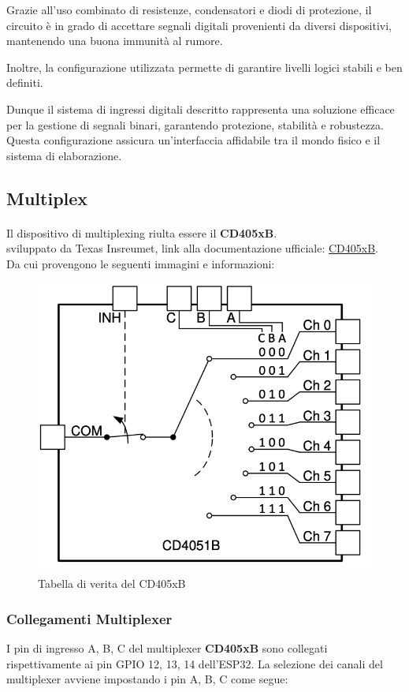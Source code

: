 \documentclass[12pt,a4paper]{report}
\begin{document}
Grazie all'uso combinato di resistenze, condensatori e diodi di protezione, il circuito è in grado di accettare segnali digitali provenienti da diversi dispositivi, mantenendo una buona immunità al rumore. 

Inoltre, la configurazione utilizzata permette di garantire livelli logici stabili e ben definiti.

Dunque il sistema di ingressi digitali descritto rappresenta una soluzione efficace per la gestione di segnali binari, garantendo protezione, stabilità e robustezza. Questa configurazione assicura un'interfaccia affidabile tra il mondo fisico e il sistema di elaborazione.

\newpage
\subsection{Multiplex}
\paragraph{ }
Il dispositivo di multiplexing riulta essere il \textbf{CD405xB}. \\
sviluppato da Texas Insreumet, link alla documentazione ufficiale: \href{https://www.ti.com/lit/ds/symlink/cd4051b.pdf}{CD405xB}. \\ 

Da cui provengono le seguenti immagini e informazioni:
\begin{figure}[H]
    \centering
    \includegraphics[width=0.5\linewidth]{../image/CD405xB.png}
    \caption{Tabella di verita del CD405xB}
\end{figure}

\subsubsection{Collegamenti Multiplexer}

I pin di ingresso A, B, C del multiplexer \textbf{CD405xB} sono collegati rispettivamente ai pin GPIO 12, 13, 14 dell'ESP32. La selezione dei canali del multiplexer avviene impostando i pin A, B, C come segue:
\end{document}
